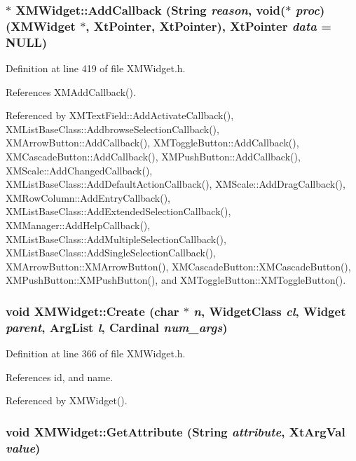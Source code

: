 \subsubsection{$\ast$ XMWidget::Add\-Callback (String {\em reason}, void($\ast$ {\em proc})(XMWidget $\ast$, Xt\-Pointer, Xt\-Pointer), Xt\-Pointer {\em data} = NULL)\hspace{0.3cm}{\tt  [inline]}}\label{classXMWidget_a13}




Definition at line 419 of file XMWidget.h.

References XMAdd\-Callback().

Referenced by XMText\-Field::Add\-Activate\-Callback(), XMList\-Base\-Class::Addbrowse\-Selection\-Callback(), XMArrow\-Button::Add\-Callback(), XMToggle\-Button::Add\-Callback(), XMCascade\-Button::Add\-Callback(), XMPush\-Button::Add\-Callback(), XMScale::Add\-Changed\-Callback(), XMList\-Base\-Class::Add\-Default\-Action\-Callback(), XMScale::Add\-Drag\-Callback(), XMRow\-Column::Add\-Entry\-Callback(), XMList\-Base\-Class::Add\-Extended\-Selection\-Callback(), XMManager::Add\-Help\-Callback(), XMList\-Base\-Class::Add\-Multiple\-Selection\-Callback(), XMList\-Base\-Class::Add\-Single\-Selection\-Callback(), XMArrow\-Button::XMArrow\-Button(), XMCascade\-Button::XMCascade\-Button(), XMPush\-Button::XMPush\-Button(), and XMToggle\-Button::XMToggle\-Button().
\subsubsection{\setlength{\rightskip}{0pt plus 5cm}void XMWidget::Create (char $\ast$ {\em n}, Widget\-Class {\em cl}, Widget {\em parent}, Arg\-List {\em l}, Cardinal {\em num\_\-args})\hspace{0.3cm}{\tt  [inline, protected]}}\label{classXMWidget_b0}




Definition at line 366 of file XMWidget.h.

References id, and name.

Referenced by XMWidget().
\subsubsection{\setlength{\rightskip}{0pt plus 5cm}void XMWidget::Get\-Attribute (String {\em attribute}, Xt\-Arg\-Val {\em value})\hspace{0.3cm}{\tt  [inline]}}\label{classXMWidget_a12}




